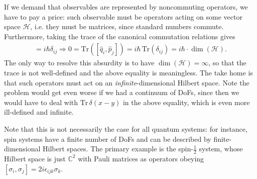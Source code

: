 \documentclass[../QFT_main.tex]{subfiles}
\begin{document}
\begin{mytheorem}
If we demand that observables are represented by noncommuting operators, we have to pay a price: such observable must be operators acting on some vector space $\mathcal{H}$, i.e. they must be matrices, since standard numbers commute.
Furthermore, taking the trace of the canonical commutation relations gives
\begin{align}
    [\hat{q}_i, \hat{p}_j] = i\hbar\delta_{ij} \Longrightarrow 0=\text{Tr}([\hat{q}_i, \hat{p}_j]) = i\hbar \,\text{Tr}(\delta_{ij}) = i \hbar \cdot \dim(\mathcal{H}).
\end{align}
The only way to resolve this absurdity is to have $\dim(\mathcal{H}) = \infty$, so that the trace is not well-defined and the above equality is meaningless.
The take home is that such operators must act on an \emph{infinite}-dimensional Hilbert space.
Note the problem would get even worse if we had a continuum of DoFs, since then we would have to deal with $\text{Tr}\,\delta(x-y)$ in the above equality, which is even more ill-defined and infinite.

Note that this is not necessarily the case for all quantum systems: for instance, spin systems have a finite number of DoFs and can be described by finite-dimensional Hilbert spaces.
The primary example is the spin-$\frac{1}{2}$ system, whose Hilbert space is just $\mathbb{C}^2$ with Pauli matrices as operators obeying $[\sigma_i, \sigma_j] = 2i \epsilon_{ijk} \sigma_k$.
\end{mytheorem}
\end{document}
